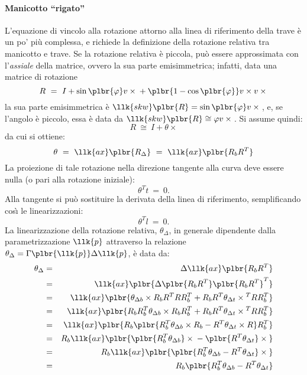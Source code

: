 \documentclass[12pt,dvips,fleqn,italian]{article}
\begin{document}
\paragraph*{Manicotto ``rigato''}
L'equazione di vincolo alla rotazione attorno alla linea di riferimento 
della trave \`e un po' pi\`u complessa, e richiede la definizione 
della rotazione relativa tra manicotto e trave.
Se la rotazione relativa \`e piccola, pu\`o essere approssimata 
con l'\emph{assiale} della matrice, ovvero la sua parte emisimmetrica; 
infatti, data una matrice di rotazione
\begin{displaymath}
    R \ = \ I + \sin\plbr{\varphi}v\times{} 
    	+ \plbr{1-\cos\plbr{\varphi}}v\times{v\times{}}
\end{displaymath}
la sua parte emisimmetrica \`e 
$\llk{skw}\plbr{R}=\sin\plbr{\varphi}v\times{}$, e, se l'angolo \`e piccolo,
essa \`e data da $\llk{skw}\plbr{R}\cong\varphi{v\times{}}$.
Si assume quindi:
\begin{displaymath}
	R \ \cong \ I + \theta\times{}
\end{displaymath}
da cui si ottiene:
\begin{displaymath}
	\theta \ = \ \llk{ax}\plbr{R_{\Delta}} 
		\ = \ \llk{ax}\plbr{R_bR^T}
\end{displaymath}
La proiezione di tale rotazione nella direzione tangente alla curva 
deve essere nulla (o pari alla rotazione iniziale):
\begin{displaymath}
	\theta^T t \ = \ 0 .
\end{displaymath}
Alla tangente si pu\`o sostituire la derivata della linea di riferimento, 
semplificando cos\`{\i} le linearizzazioni:
\begin{displaymath}
	\theta^T l \ = \ 0 .
\end{displaymath}
La linearizzazione della rotazione relativa, $\theta_{\Delta}$,
in generale dipendente dalla parametrizzazione $\llk{p}$ attraverso
la relazione $ \theta_{\Delta}=\Gamma\plbr{\llk{p}}\Delta{\llk{p}} $, 
\`e data da:
\begin{eqnarray*}
	\theta_{\Delta} & = & \Delta\llk{ax}\plbr{R_bR^T} \\
	& = & \llk{ax}\plbr{\Delta\plbr{R_bR^T}\plbr{R_bR^T}^T} \\
	& = & \llk{ax}\plbr{\theta_{\Delta{b}}\times{R_bR^TRR_b^T}
		+R_bR^T\theta_{\Delta{t}}\times{}^TRR_b^T} \\
	& = & \llk{ax}\plbr{R_bR_b^T\theta_{\Delta{b}}\times{R_bR_b^T}
		+R_bR^T\theta_{\Delta{t}}\times{}^TRR_b^T} \\
	& = & \llk{ax}\plbr{
		R_b\plbr{
			R_b^T\theta_{\Delta{b}}\times{R_b}
			-R^T\theta_{\Delta{t}}\times{R}
		}R_b^T
	} \\
	& = & R_b\llk{ax}\plbr{
		\plbr{R_b^T\theta_{\Delta{b}}}\times{}
		-\plbr{R^T\theta_{\Delta{t}}}\times{}
	} \\
	& = & R_b\llk{ax}\plbr{\plbr{
		R_b^T\theta_{\Delta{b}} - R^T\theta_{\Delta{t}}
	}\times{}} \\
	& = & R_b\plbr{R_b^T\theta_{\Delta{b}}-R^T\theta_{\Delta{t}}}
\end{eqnarray*}
\end{document}

